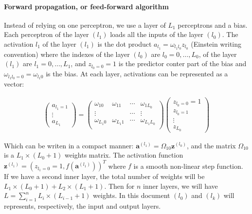 \documentclass[final, paper=letter,5p,times,twocolumn]{elsarticle}
\begin{document}
\paragraph{Forward propagation, or feed-forward algorithm}{Instead of relying on one perceptron, we use a layer of $L_{1}$ perceptrons and a bias. Each perceptron of the layer $(l_{1})$ loads all the inputs of the layer $(l_{0})$. The activation $l_{1}$ of the layer $(l_{1})$ is the dot product $a_{l_{1}} = \omega_{l_{1}l_{0}}z_{l_{0}}$ (Einstein writing convention) where the indexes of the layer $(l_{0})$ are $l_{0} = 0, \dots, L_{0}$, of the layer $(l_{1})$ are $l_{1} = 0, \dots, L_{1}$, and $z_{l_{0} = 0} = 1$ is the predictor conter part of the bias and $\omega_{l_{1}l_{0} = 0} = \omega_{l_{1}0}$ is the bias. At each layer, activations can be represented as a vector:

\begin{eqnarray*}
  \left(
  \begin{array}{c}
    a_{l_{1} = 1} \\
    \vdots \\
    a_{L_{1}}
  \end{array}
  \right) = \left(
  \begin{array}{cccc}
    \omega_{10} & \omega_{11} & \cdots & \omega_{1L_{0}} \\
    \vdots     &            & \cdots & \vdots \\
    \omega_{L_{1}0} & \omega_{L_{1}1} & \cdots & \omega_{L_{1}L_{0}} \\
  \end{array}
  \right)  \left(
  \begin{array}{c}
    z_{l_{0} = 0} = 1 \\
    z_{l_{0} = 1} \\
    \vdots \\
    z_{L_{0}} 
  \end{array}
  \right)
\end{eqnarray*}

Which can be writen in a compact manner: $\bm{a}^{(l_{1})} = \Omega_{10}\bm{z}^{(l_{0})}$, and the matrix $\Omega_{10}$ is a $L_{1}\times(L_{0}+1)$ weights matrix. The activation function $\bm{z}^{(l_{1})} = (z_{l_{1} = 0} = 1, f(\bm{a}^{(l_{1})}))^{T}$ where $f$ is a smooth non-linear step function. If we have a second inner layer, the total number of weights will be $L_{1}\times(L_{0}+1) + L_{2}\times(L_{1}+1)$. Then for $n$ inner layers, we will have $L = \sum_{i = 1}^{n}L_{i}\times(L_{i-1}+1)$ weights. In this document $(l_{0})$ and $(l_{k})$ will represents, respectively, the input and output layers. }
\end{document}
